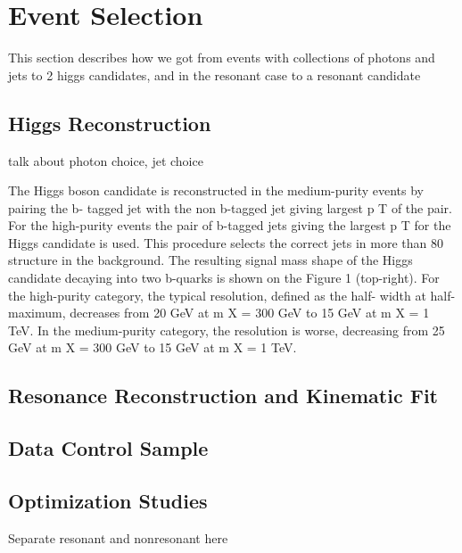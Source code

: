 \chapter{Event Selection\label{ch:selection}}

This section describes how we got from events with collections of photons and jets to 2 higgs candidates, and in the resonant case to a resonant candidate

\section{Higgs Reconstruction\label{sec:higgsreconstruction}}
talk about photon choice, jet choice

The  Higgs  boson  candidate  is  reconstructed  in  the  medium-purity  events  by  pairing  the  b-
tagged jet with the non b-tagged jet giving largest
p
T
of the pair.  For the high-purity events
the pair of b-tagged jets giving the largest
p
T
for the Higgs candidate is used.  This procedure
selects the correct jets in more than 80%
structure in the background.
The resulting signal mass shape of the Higgs candidate decaying into two b-quarks is shown on
the Figure 1 (top-right). For the high-purity category, the typical resolution, defined as the half-
width at half-maximum, decreases from 20 GeV at
m
X
=
300 GeV to 15 GeV at
m
X
=
1 TeV. In
the medium-purity category, the resolution is worse, decreasing from 25 GeV at
m
X
=
300 GeV
to 15 GeV at
m
X
=
1 TeV.



\section{Resonance Reconstruction and Kinematic Fit\label{sec:Xreconstruction}}

\section{Data Control Sample\label{sec:dataCS}}

\section{Optimization Studies\label{sec:optim}}
Separate resonant and nonresonant here


